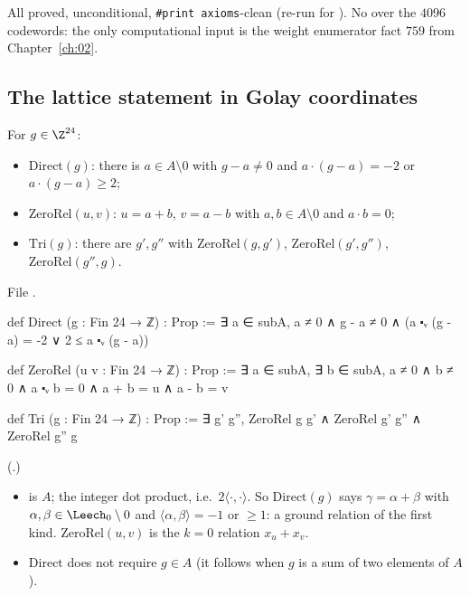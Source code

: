 \begin{status}All proved, unconditional, \texttt{\#print axioms}-clean (re-run for ).  No
 over the $4096$ codewords: the only computational input is the weight enumerator fact
$759$ from Chapter~\ref{ch:02}.\end{status}

\subsection{The lattice statement in Golay coordinates}

\begin{definition}\label{ch12:def:direct}
For $g\in\Z^{24}$:
\begin{itemize}
\item $\mathrm{Direct}(g)$: there is $a\in A\setminus0$ with $g-a\neq0$ and $a\cdot(g-a)=-2$ or
  $a\cdot(g-a)\ge2$;
\item $\mathrm{ZeroRel}(u,v)$: $u=a+b$, $v=a-b$ with $a,b\in A\setminus0$ and $a\cdot b=0$;
\item $\mathrm{Tri}(g)$: there are $g',g''$ with $\mathrm{ZeroRel}(g,g')$, $\mathrm{ZeroRel}(g',g'')$,
  $\mathrm{ZeroRel}(g'',g)$.
\end{itemize}
\end{definition}
File .
\begin{leancode}
def Direct (g : Fin 24 → ℤ) : Prop :=
  ∃ a ∈ subA, a ≠ 0 ∧ g - a ≠ 0 ∧ (a ⬝ᵥ (g - a) = -2 ∨ 2 ≤ a ⬝ᵥ (g - a))

def ZeroRel (u v : Fin 24 → ℤ) : Prop :=
  ∃ a ∈ subA, ∃ b ∈ subA, a ≠ 0 ∧ b ≠ 0 ∧ a ⬝ᵥ b = 0 ∧ a + b = u ∧ a - b = v

def Tri (g : Fin 24 → ℤ) : Prop :=
  ∃ g' g'', ZeroRel g g' ∧ ZeroRel g' g'' ∧ ZeroRel g'' g
\end{leancode}
(.)
\begin{dictionary}
\begin{itemize}
\item {} is $A$;  the integer dot product, i.e.\ $2\langle\cdot,\cdot\rangle$.  So
  $\mathrm{Direct}(g)$ says $\gamma=\alpha+\beta$ with $\alpha,\beta\in\Leech_0\setminus0$ and
  $\langle\alpha,\beta\rangle=-1$ or $\ge1$: a ground relation of the first kind.  $\mathrm{ZeroRel}(u,v)$
  is the $k=0$ relation $x_u+x_v$.
\item $\mathrm{Direct}$ does not require $g\in A$ (it follows when $g$ is a sum of two elements of $A$).
\end{itemize}
\end{dictionary}

